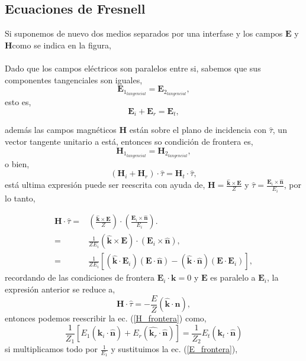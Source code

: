 \documentclass[11pt,fleqn]{book} %
\begin{document}
\subsection{Ecuaciones de Fresnell}
Si suponemos de nuevo dos medios separados por una interfase y los campos $\textbf{E}$ y $\textbf{H}$como se indica en la figura,\\\\
Dado que los campos el\'ectricos son paralelos entre si, sabemos que sus componentes tangenciales son iguales,
\begin{equation*}
 \textbf{E}_{1_{tangencial}}=\textbf{E}_{2_{tangencial}},
 \end{equation*}
esto es,
\begin{equation}
\textbf{E}_i+\textbf{E}_r=\textbf{E}_t, \label{E_frontera}
\end{equation}


adem\'as las campos magn\'eticos $\textbf{H}$ est\'an sobre el plano de incidencia con $\hat{\tau}$, un vector tangente unitario a est\'a, entonces so condici\'on de frontera es,
\begin{equation*}
 \textbf{H}_{1_{tangencial}}=\textbf{H}_{2_{tangencial}},
 \end{equation*}
o bien,
\begin{equation}
(\textbf{H}_i+\textbf{H}_r)\cdot \hat{\tau}=\textbf{H}_t\cdot \hat{\tau}, \label{H_frontera}
\end{equation}
est\'a ultima expresi\'on puede ser reescrita con ayuda de, $\textbf{H}=\frac{\hat{\textbf{k}}\times\textbf{E}}{Z}$ y $\hat{\tau}=\frac{\textbf{E}_i\times\hat{\textbf{n}}}{E_i}$, por lo tanto,

\begin{equation*}
\begin{split}
\textbf{H}\cdot \hat{\tau}=&\left(\frac{\hat{\textbf{k}}\times\textbf{E}}{Z}\right)\cdot\left( \frac{\textbf{E}_i\times\hat{\textbf{n}}}{E_i} \right).\\
=&\frac{1}{ZE_i}(\hat{\textbf{k}}\times\textbf{E})\cdot(\textbf{E}_i\times\hat{\textbf{n}}),\\
=&\frac{1}{ZE_i} \left[ (\hat{\textbf{k}}\cdot\textbf{E}_i)(\textbf{E}\cdot\hat{\textbf{n}})-(\hat{\textbf{k}}\cdot\hat{\textbf{n}})(\textbf{E}\cdot\textbf{E}_i) \right],
\end{split}
\end{equation*}
 recordando de las condiciones de frontera $\textbf{E}_i\cdot\textbf{k}=0$ y $\textbf{E}$ es paralelo a $\textbf{E}_i$, la expresi\'on anterior se reduce a,
 \begin{equation*}
\textbf{H}\cdot \hat{\tau}=-\frac{E}{Z}(\hat{\textbf{k}}\cdot\hat{\textbf{n}}),
 \end{equation*}
entonces podemos reescribir la ec. (\ref{H_frontera}) como,
\begin{equation} \label{desarrollo}
\frac{1}{Z_1}\left[E_1(\hat{\textbf{k}_i}\cdot\hat{\textbf{n}})+E_r(\hat{\textbf{k}_r}\cdot\hat{\textbf{n}})\right]=\frac{1}{Z_2}E_t(\hat{\textbf{k}_t}\cdot\hat{\textbf{n}})
\end{equation}
si multiplicamos todo por $\frac{1}{E_1}$ y sustituimos la ec. (\ref{E_frontera}),
\end{document}
